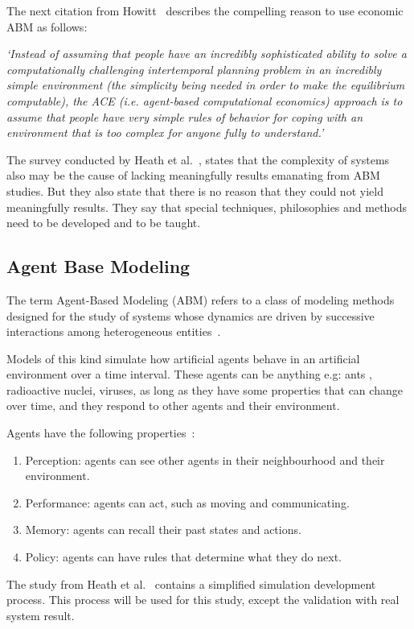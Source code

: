The next citation from Howitt~\cite{howitt2012have} describes the compelling reason to use economic ABM as follows:

\textit{`Instead of assuming that people have an incredibly sophisticated ability to solve a computationally challenging intertemporal planning problem in an incredibly simple environment (the simplicity being needed in order to make the equilibrium computable), the ACE (i.e.
agent-based computational economics) approach is to assume that people have very simple rules of behavior for coping with an environment that is too complex for anyone fully to understand.'}

The survey conducted by Heath et al.~\cite{heath2009survey}, states that the complexity of systems also may be the cause of lacking meaningfully results emanating from ABM studies.
But they also state that there is no reason that they could not yield meaningfully results.
They say that special techniques, philosophies and methods need to be developed and to be taught.


\subsection{Agent Base Modeling}\label{subsec:agent-base-modeling}
The term Agent-Based Modeling (ABM) refers to a class of modeling methods designed for the study of systems whose dynamics are driven by successive interactions among heterogeneous entities~\cite{tesfatsion2023agent}.

Models of this kind simulate how artificial agents behave in an artificial environment over a time interval.
These agents can be anything e.g: ants , radioactive nuclei, viruses, as long as they have some properties that can change over time, and they respond to other agents and their environment.

Agents have the following properties~\cite{hamill2016agent}:
\begin{enumerate}
  \item Perception: agents can see other agents in their neighbourhood and their environment.
  \item Performance: agents can act, such as moving and communicating.
  \item Memory: agents can recall their past states and actions.
  \item Policy: agents can have rules that determine what they do next.
\end{enumerate}

The study from Heath et al.~\cite{heath2009survey} contains a simplified simulation development process.
This process will be used for this study, except the validation with real system result.

